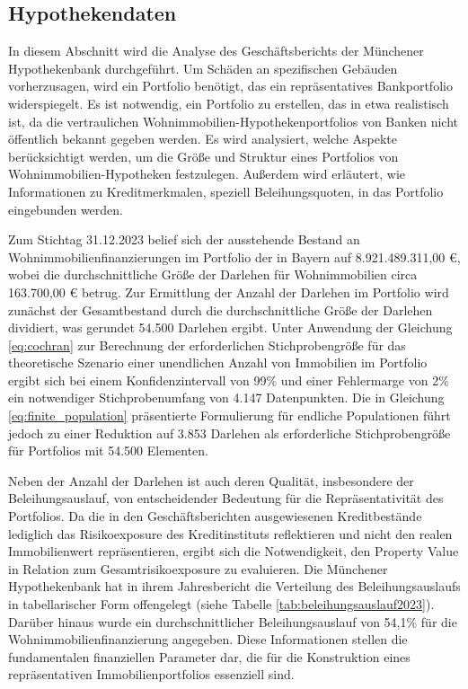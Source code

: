 \subsection{Hypothekendaten}
In diesem Abschnitt wird die Analyse des Geschäftsberichts der Münchener Hypothekenbank durchgeführt. Um Schäden an spezifischen Gebäuden vorherzusagen, wird ein Portfolio benötigt, das ein repräsentatives Bankportfolio widerspiegelt. Es ist notwendig, ein Portfolio zu erstellen, das in etwa realistisch ist, da die vertraulichen Wohnimmobilien-Hypothekenportfolios von Banken nicht öffentlich bekannt gegeben werden. Es wird analysiert, welche Aspekte berücksichtigt werden, um die Größe und Struktur eines Portfolios von Wohnimmobilien-Hypotheken festzulegen. Außerdem wird erläutert, wie Informationen zu Kreditmerkmalen, speziell Beleihungsquoten, in das Portfolio eingebunden werden.

Zum Stichtag 31.12.2023 belief sich der ausstehende Bestand an Wohnimmobilienfinanzierungen im Portfolio der \textcite{MuenchenerHyp2023} in Bayern auf 8.921.489.311,00 €, wobei die durchschnittliche Größe der Darlehen für Wohnimmobilien circa 163.700,00 € betrug. Zur Ermittlung der Anzahl der Darlehen im Portfolio wird zunächst der Gesamtbestand durch die durchschnittliche Größe der Darlehen dividiert, was gerundet 54.500 Darlehen ergibt. Unter Anwendung der Gleichung \ref{eq:cochran} zur Berechnung der erforderlichen Stichprobengröße für das theoretische Szenario einer unendlichen Anzahl von Immobilien im Portfolio ergibt sich bei einem Konfidenzintervall von 99\% und einer Fehlermarge von 2\% ein notwendiger Stichprobenumfang von 4.147 Datenpunkten. Die in Gleichung \ref{eq:finite_population} präsentierte Formulierung für endliche Populationen führt jedoch zu einer Reduktion auf 3.853 Darlehen als erforderliche Stichprobengröße für Portfolios mit 54.500 Elementen.

Neben der Anzahl der Darlehen ist auch deren Qualität, insbesondere der Beleihungsauslauf, von entscheidender Bedeutung für die Repräsentativität des Portfolios. Da die in den Geschäftsberichten ausgewiesenen Kreditbestände lediglich das Risikoexposure des Kreditinstituts reflektieren und nicht den realen Immobilienwert repräsentieren, ergibt sich die Notwendigkeit, den Property Value in Relation zum Gesamtrisikoexposure zu evaluieren. Die Münchener Hypothekenbank hat in ihrem Jahresbericht die Verteilung des Beleihungsauslaufs in tabellarischer Form offengelegt (siehe Tabelle \ref{tab:beleihungsauslauf2023}). Darüber hinaus wurde ein durchschnittlicher Beleihungsauslauf von 54,1\% für die Wohnimmobilienfinanzierung angegeben. Diese Informationen stellen die fundamentalen finanziellen Parameter dar, die für die Konstruktion eines repräsentativen Immobilienportfolios essenziell sind.


